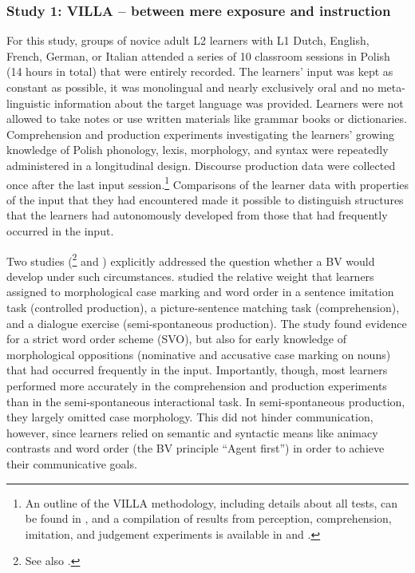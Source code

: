 \documentclass[output=paper]{langscibook}
\begin{document}
\subsubsection{Study 1: VILLA -- between mere exposure and instruction}\label{sec:benazzo:4.2.1}

For this study, groups of novice adult L2 learners with L1 Dutch, English, French, German, or Italian attended a series of 10 classroom sessions in Polish (14 hours in total) that were entirely recorded. The learners’ input was kept as constant as possible, it was monolingual and nearly exclusively oral and no meta-linguistic information about the target language was provided. Learners were not allowed to take notes or use written materials like grammar books or dictionaries. Comprehension and production experiments investigating the learners’ growing knowledge of Polish phonology, lexis, morphology, and syntax were repeatedly administered in a longitudinal design. Discourse production data were collected once after the last input session.\footnote{ {An outline of the VILLA methodology, including details about all tests, can be found in \citet{DimrothEtAl2013}, and a compilation of results from perception, comprehension, imitation, and judgement experiments is available in \citet{WatorekEtAl2017} and \citet{Saturno2016, Saturno2020}.}} Comparisons of the learner data with properties of the input that they had encountered made it possible to distinguish structures that the learners had autonomously developed from those that had frequently occurred in the input.

Two studies (\citealt{Saturno2020}\footnote{See also \citet{SaturnoWatorek2020}.} and \citealt{Dimroth2018}) explicitly addressed the question whether a BV would develop under such circumstances. \citet{Saturno2020} studied the relative weight that learners assigned to morphological case marking and word order in a sentence imitation task (controlled production), a picture-sentence matching task (comprehension), and a dialogue exercise (semi-spon\-ta\-ne\-ous production). The study found evidence for a strict word order scheme (SVO), but also for early knowledge of morphological oppositions (nominative and accusative case marking on nouns) that had occurred frequently in the input.  Importantly, though, most learners performed more accurately in the comprehension and production experiments than in the semi-spontaneous interactional task. In semi-spon\-ta\-ne\-ous production, they largely omitted case morphology. This did not hinder communication, however, since learners relied on semantic and syntactic means like animacy contrasts and word order (the BV principle “Agent first”) in order to achieve their communicative goals.
\end{document}
